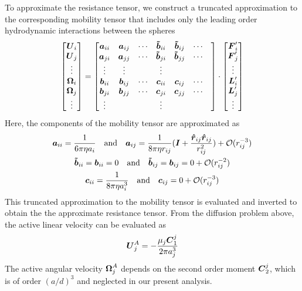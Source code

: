 \begin{appendices}
To approximate the resistance tensor, we construct a truncated approximation to the corresponding mobility tensor that includes only the leading order hydrodynamic interactions between the spheres
\begin{equation}
    \begin{bmatrix} \boldsymbol{U}_i \\ \boldsymbol{U}_j \\ \vdots \\ \boldsymbol{\Omega}_i \\ \boldsymbol{\Omega}_j \\ \vdots \end{bmatrix}\label{eq:mobility}
    =
    \begin{bmatrix} 
        \boldsymbol{a}_{ii} & \boldsymbol{a}_{ij} & \cdots & \boldsymbol{\tilde{b}}_{ii} & \boldsymbol{\tilde{b}}_{ij} & \cdots \\ 
        \boldsymbol{a}_{ji} & \boldsymbol{a}_{jj} & \cdots & \boldsymbol{\tilde{b}}_{ji} & \boldsymbol{\tilde{b}}_{jj} & \cdots \\  
        \vdots  & \vdots & & \vdots & &  & \\ 
        \boldsymbol{b}_{ii} & \boldsymbol{b}_{ij} & \cdots & \boldsymbol{c}_{ii} & \boldsymbol{c}_{ij} & \cdots \\ 
        \boldsymbol{b}_{ji} & \boldsymbol{b}_{jj} & \cdots & \boldsymbol{c}_{ji} & \boldsymbol{c}_{jj} & \cdots \\  
        \vdots  & & & \vdots & &  &  
    \end{bmatrix} 
    \cdot
    \begin{bmatrix} \boldsymbol{F}'_i \\ \boldsymbol{F}'_j \\ \vdots \\ \boldsymbol{L}'_i \\ \boldsymbol{L}'_j \\ \vdots \end{bmatrix} 
\end{equation}
Here, the components of the mobility tensor are approximated as 
\begin{gather}
    \boldsymbol{a}_{ii} = \frac{1}{6\pi \eta a_i} \quad \text{and} \quad \boldsymbol{a}_{ij} = \frac{1}{8\pi \eta r_{ij}} (\boldsymbol{I} +\frac{ \boldsymbol{\hat{r}}_{ij}\boldsymbol{\hat{r}}_{ij}}{r_{ij}^2}    ) + \mathcal{O}(r^{-3}_{ij})
    \\
    \boldsymbol{\tilde{b}}_{ii} =\boldsymbol{b}_{ii} = 0 \quad \text{and} \quad \boldsymbol{\tilde{b}}_{ij} = \boldsymbol{b}_{ij} = 0 + \mathcal{O}(r^{-2}_{ij})
    \\
    \boldsymbol{c}_{ii} = \frac{1}{8\pi \eta a^3_i} \quad \text{and} \quad \boldsymbol{c}_{ij} = 0 + \mathcal{O}(r^{-3}_{ij})
\end{gather}
This truncated approximation to the mobility tensor is evaluated and inverted to obtain the the approximate resistance tensor.  From the diffusion problem above, the active linear velocity can be evaluated as 
\begin{equation}
    \boldsymbol{U}_j^A = -\frac{\mu_j \boldsymbol{C}_1^j}{2 \pi a_j^3}
\end{equation}
The active angular velocity $\boldsymbol{\Omega}_j^A$ depends on the second order moment $\boldsymbol{C}_2^j$, which is of order $(a/d)^3$ and neglected in our present analysis.



\end{appendices}
